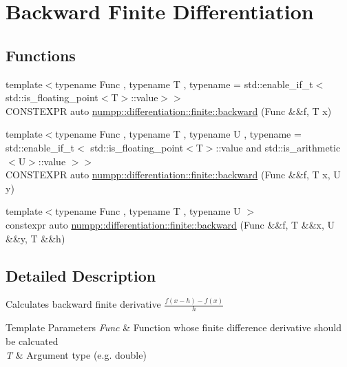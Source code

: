 \hypertarget{group__numpp__differentiation__finite__backward}{}\section{Backward Finite Differentiation}
\label{group__numpp__differentiation__finite__backward}
\subsection*{Functions}
\begin{DoxyCompactItemize}
\item 
{\footnotesize template$<$typename Func , typename T , typename  = std\+::enable\+\_\+if\+\_\+t$<$std\+::is\+\_\+floating\+\_\+point$<$\+T$>$\+::value$>$$>$ }\\C\+O\+N\+S\+T\+E\+X\+PR auto \hyperlink{group__numpp__differentiation__finite__backward_gaf772b22eb473fffdb4c4eb2333d21937}{numpp\+::differentiation\+::finite\+::backward} (Func \&\&f, T x)
\item 
{\footnotesize template$<$typename Func , typename T , typename U , typename  = std\+::enable\+\_\+if\+\_\+t$<$      std\+::is\+\_\+floating\+\_\+point$<$\+T$>$\+::value and      std\+::is\+\_\+arithmetic$<$\+U$>$\+::value    $>$$>$ }\\C\+O\+N\+S\+T\+E\+X\+PR auto \hyperlink{group__numpp__differentiation__finite__backward_ga33f8373a02912cf6b680d0d8955bea3a}{numpp\+::differentiation\+::finite\+::backward} (Func \&\&f, T x, U y)
\item 
{\footnotesize template$<$typename Func , typename T , typename U $>$ }\\constexpr auto \hyperlink{group__numpp__differentiation__finite__backward_ga3015b47eec3f468c07e5d72e88ea22dc}{numpp\+::differentiation\+::finite\+::backward} (Func \&\&f, T \&\&x, U \&\&y, T \&\&h)
\end{DoxyCompactItemize}


\subsection{Detailed Description}
Calculates backward finite derivative $\frac{f(x-h)-f(x)}{h}$


\begin{DoxyTemplParams}{Template Parameters}
{\em Func} & Function whose finite difference derivative should be calcuated \\
\hline
{\em T} & Argument type (e.\+g. double)\\
\hline
\end{DoxyTemplParams}


